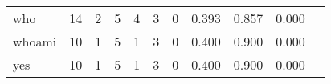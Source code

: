 \begin{longtable}{lp{1.2cm}p{1.2cm}p{1.2cm}p{1.2cm}p{1.2cm}p{1.2cm}p{1.2cm}p{1.2cm}p{1.2cm}p{1.2cm}}
who       &                                    14 &                                                  2 &                                                  5 &                                                  4 &                                                  3 &                                                  0 &                                         0.393 &                                              0.857 &                                              0.000 \\
whoami    &                                    10 &                                                  1 &                                                  5 &                                                  1 &                                                  3 &                                                  0 &                                         0.400 &                                              0.900 &                                              0.000 \\
yes       &                                    10 &                                                  1 &                                                  5 &                                                  1 &                                                  3 &                                                  0 &                                         0.400 &                                              0.900 &                                              0.000 \\
\end{longtable}
